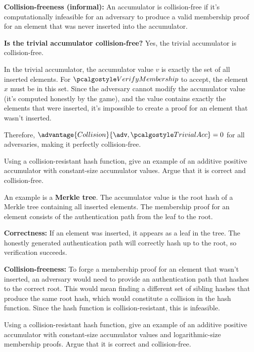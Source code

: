 \ifsolutions
\begin{mysolution}
  \textbf{Collision-freeness (informal):} An accumulator is collision-free if it's computationally infeasible for an adversary to produce a valid membership proof for an element that was never inserted into the accumulator.
  
  \textbf{Is the trivial accumulator collision-free?} Yes, the trivial accumulator is collision-free.
  
  In the trivial accumulator, the accumulator value $v$ is exactly the set of all inserted elements.
  For $\algo{VerifyMembership}$ to accept, the element $x$ must be in this set.
  Since the adversary cannot modify the accumulator value (it's computed honestly by the game), and the value contains exactly the elements that were inserted, it's impossible to create a proof for an element that wasn't inserted.
  
  Therefore, $\advantage{Collision}{\adv, \algo{TrivialAcc}} = 0$ for all adversaries, making it perfectly collision-free.
\end{mysolution}
\fi

\begin{exercise}
  Using a collision-resistant hash function, give an example of an additive positive accumulator with constant-size accumulator values.
  Argue that it is correct and collision-free.
\end{exercise}

\ifsolutions
\begin{mysolution}
  An example is a \textbf{Merkle tree}.
  The accumulator value is the root hash of a Merkle tree containing all inserted elements.
  The membership proof for an element consists of the authentication path from the leaf to the root.
  
  \textbf{Correctness:} If an element was inserted, it appears as a leaf in the tree.
  The honestly generated authentication path will correctly hash up to the root, so verification succeeds.
  
  \textbf{Collision-freeness:} To forge a membership proof for an element that wasn't inserted, an adversary would need to provide an authentication path that hashes to the correct root.
  This would mean finding a different set of sibling hashes that produce the same root hash, which would constitute a collision in the hash function.
  Since the hash function is collision-resistant, this is infeasible.
\end{mysolution}
\fi

\begin{exercise}[Optional]
  Using a collision-resistant hash function, give an example of an additive positive accumulator with constant-size accumulator values and logarithmic-size membership proofs.
  Argue that it is correct and collision-free.
\end{exercise}

